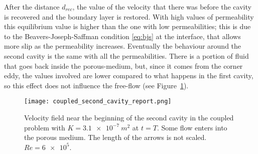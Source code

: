After the distance $d_{rec}$, the value of the velocity that there was 
before the cavity is recovered and the boundary layer is restored. With high 
values of permeability this equilibrium value is higher than the one with low 
permeabilities; this is due to the Beavers-Joseph-Saffman condition \eqref{eq:bjs} at the interface, that allows 
more slip as the permeability increases. Eventually the behaviour around the 
second cavity is the same with all the permeabilities. There is a portion of fluid that 
goes back inside the porous-medium, but, since it comes from the corner eddy, the 
values involved are lower compared to what happens in the first cavity, so this effect does not influence the free-flow (see 
Figure~\ref{fig:coupledsecondcav}).
\begin{figure}
	\centering
	\texttt{[image: coupled\_second\_cavity\_report.png]}
	\caption[Velocity field near the beginning of the second cavity in the coupled problem]{Velocity field near the beginning of the second cavity in the coupled problem with $K=\SI{3.1e-7}{m^2}$ at $t=T$. Some flow enters into the porous medium. The length of the arrows is not scaled. $Re=\num{6e5}$.}
	\label{fig:coupledsecondcav}
\end{figure}